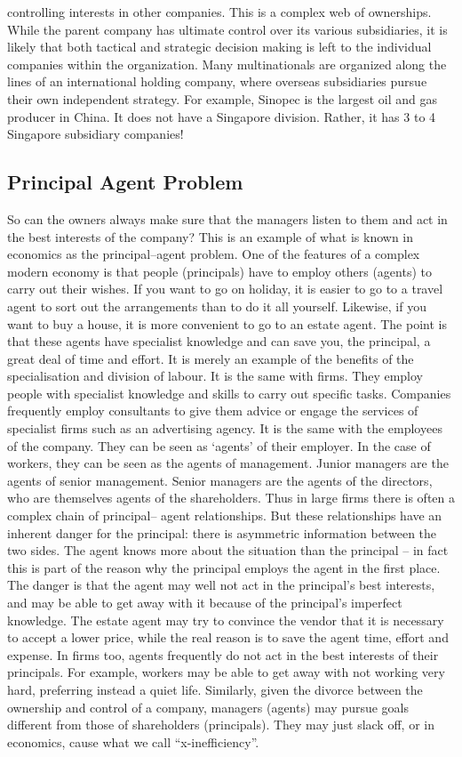\documentclass[DIV=calc,11pt,parskip,numbers=noenddot]{scrartcl} %
\begin{document}
controlling interests in other companies. This is a complex web of ownerships. While the parent company has ultimate control over its various subsidiaries, it is likely that both tactical and strategic decision making is left to the individual companies within the organization. Many multinationals are organized along the lines of an international holding company, where overseas subsidiaries pursue their own independent strategy. For example, Sinopec is the largest oil and gas producer in China. It does not have a Singapore division. Rather, it has 3 to 4 Singapore subsidiary companies!
\subsection{Principal Agent Problem}
 So can the owners always make sure that the managers listen to them and act in the best interests of the company? This is an example of what is known in economics as the principal–agent problem. One of the features of a complex modern economy is that people (principals) have to employ others (agents) to carry out their wishes. If you want to go on holiday, it is easier to go to a travel agent to sort out the arrangements than to do it all yourself. Likewise, if you want to buy a house, it is more convenient to go to an estate agent. The point is that these agents have specialist knowledge and can save you, the principal, a great deal of time and effort. It is merely an example of the benefits of the specialisation and division of labour. It is the same with firms. They employ people with specialist knowledge and skills to carry out specific tasks. Companies frequently employ consultants to give them advice or engage the services of specialist firms such as an advertising agency. It is the same with the employees of the company. They can be seen as ‘agents’ of their employer. In the case of workers, they can be seen as the agents of management. Junior managers are the agents of senior management. Senior managers are the agents of the directors, who are themselves agents of the shareholders. Thus in large firms there is often a complex chain of principal– agent relationships. But these relationships have an inherent danger for the principal: there is asymmetric information between the two sides. The agent knows more about the situation than the principal – in fact this is part of the reason why the principal employs the agent in the first place. The danger is that the agent may well not act in the principal’s best interests, and may be able to get away with it because of the principal’s imperfect knowledge. The estate agent may try to convince the vendor that it is necessary to accept a lower price, while the real reason is to save the agent time, effort and expense. In firms too, agents frequently do not act in the best interests of their principals. For example, workers may be able to get away with not working very hard, preferring instead a quiet life. Similarly, given the divorce between the ownership and control of a company, managers (agents) may pursue goals different from those of shareholders (principals). They may just slack off, or in economics, cause what we call “x-inefficiency”.
\end{document}
